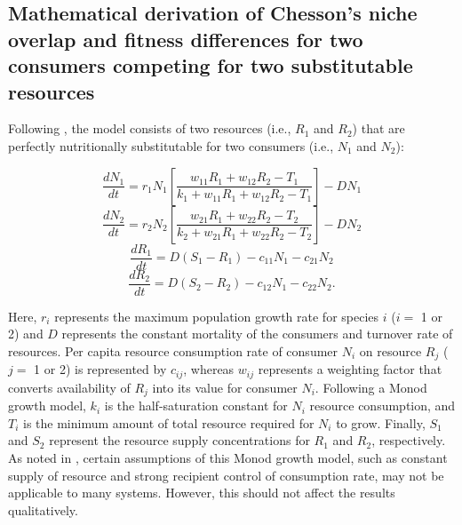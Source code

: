 \subsection*{Mathematical derivation of Chesson's niche overlap and fitness differences for two consumers competing for two substitutable resources}
Following \citet[p.~270]{tilman1982}, the model consists of two resources (i.e., $R_{1}$ and $R_{2}$) that are perfectly nutritionally substitutable for two consumers (i.e., $N_{1}$ and $N_{2}$): 

\begin{equation}
\frac{{d{N_1}}}{{dt}} = {r_1}{N_1}\left[ {\frac{{{w_{11}}{R_1} + {w_{12}}{R_2} - {T_1}}}{{{k_1} + {w_{11}}{R_1} + {w_{12}}{R_2} - {T_1}}}} \right] - D{N_1} 
\tag{S2.2.1}\label{eq:S2.2.1}
\end{equation}
\begin{equation}
\frac{{d{N_2}}}{{dt}} = {r_2}{N_2}\left[ {\frac{{{w_{21}}{R_1} + {w_{22}}{R_2} - {T_2}}}{{{k_2} + {w_{21}}{R_1} + {w_{22}}{R_2} - {T_2}}}} \right] - D{N_2} 
\tag{S2.2.2}\label{eq:S2.2.2}
\end{equation}
\begin{equation}
\frac{{d{R_1}}}{{dt}} = D\left( {{S_1} - {R_1}} \right) - {c_{11}}{N_1} - {c_{21}}{N_2} \tag{S2.2.3}\label{eq:S2.2.3}
\end{equation}
\begin{equation}
\frac{{d{R_2}}}{{dt}} = D\left( {{S_2} - {R_2}} \right) - {c_{12}}{N_1} - {c_{22}}{N_2}.
\tag{S2.2.4}\label{eq:S2.2.4}
\end{equation}

\noindent Here, $r_{i}$ represents the maximum population growth rate for species $i$ ($i = $ 1 or 2) and $D$ represents the constant mortality of the consumers and turnover rate of resources. Per capita resource consumption rate of consumer $N_{i}$ on resource $R_{j}$ ($j = $ 1 or 2) is represented by $c_{ij}$, whereas $w_{ij}$ represents a weighting factor that converts availability of $R_{j}$ into its value for consumer $N_{i}$. Following a Monod growth model, $k_{i}$ is the half-saturation constant for $N_{i}$ resource consumption, and $T_{i}$ is the minimum amount of total resource required for $N_{i}$ to grow. Finally, $S_{1}$ and $S_{2}$ represent the resource supply concentrations for $R_{1}$ and $R_{2}$, respectively. As noted in \cite{Kleinhesselink2015}, certain assumptions of this Monod growth model, such as constant supply of resource and strong recipient control of consumption rate, may not be applicable to many systems. However, this should not affect the results qualitatively.
\par


